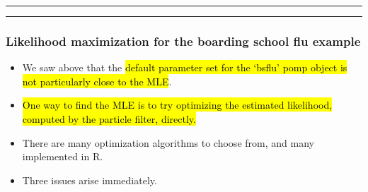 \documentclass[]{article}
\begin{document}
\begin{center}\rule{0.5\linewidth}{\linethickness}\end{center}

\begin{center}\rule{0.5\linewidth}{\linethickness}\end{center}

\subsubsection{Likelihood maximization for the boarding school flu
example}\label{likelihood-maximization-for-the-boarding-school-flu-example}

\begin{itemize}
\item
  We saw above that the \hl{default parameter set for the `bsflu' pomp
  object is not particularly close to the MLE}.
\item
  \hl{One way to find the MLE is to try optimizing the estimated likelihood,
  computed by the particle filter, directly.}
\item
  There are many optimization algorithms to choose from, and many
  implemented in R.
\item
  Three issues arise immediately.
\end{itemize}
\end{document}
